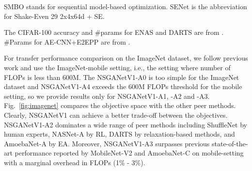 \documentclass[journal]{IEEEtran}
\def\ourmethod{NSGANetV1}
\theoremstyle{definition}
\theoremstyle{remark}
\def\sota{state-of-the-art}
\begin{document}
\begin{table*}[!htbp]
{\begin{subtable}[h]{0.92\textwidth}
{\begin{tabular}{@{ }l|cc|cc|cc|cc@{ }}
        \end{tabular}}
     \end{subtable}}
      \begin{minipage}{.9\linewidth}
      \begin{threeparttable}
        \begin{tablenotes}
        \scriptsize{
        \item[\textdagger] SMBO stands for sequential model-based optimization. SENet is the abbreviation for Shake-Even 29 2x4x64d + SE.
        \item[\textdaggerdbl] The CIFAR-100 accuracy and \#params for ENAS \cite{pmlr-v80-pham18a} and DARTS \cite{liu2018darts} are from \cite{Dong_2019_CVPR}. \#Params for AE-CNN+E2EPP are from \cite{ae-cnn}.
        }
        \end{tablenotes}
      \end{threeparttable}
    \end{minipage}
\end{table*}













For transfer performance comparison on the ImageNet dataset, we follow previous work \cite{nasnet2018,liu2018darts,pmlr-v80-pham18a,sandler2018mobilenetv2} and use the ImageNet-mobile setting, i.e., the setting where number of FLOPs is less than 600M. The \ourmethod{}-A0 is too simple for the ImageNet dataset and \ourmethod{}-A4 exceeds the 600M FLOPs threshold for the mobile setting, so we provide results only for \ourmethod{}-A1, -A2 and -A3. Fig.~\ref{fig:imagenet} compares the objective space with the other peer methods. Clearly, \ourmethod{} can achieve a better trade-off between the objectives. \ourmethod{}-A2 dominates a wide range of peer methods including ShuffleNet \cite{zhang2018shufflenet} by human experts, NASNet-A \cite{nasnet2018} by RL, DARTS \cite{liu2018darts} by relaxation-based methods, and AmoebaNet-A \cite{real2019regularized} by EA. Moreover, \ourmethod{}-A3 surpasses previous \sota{} performance reported by MobileNet-V2 \cite{sandler2018mobilenetv2} and AmoebaNet-C \cite{real2019regularized} on mobile-setting with a marginal overhead in FLOPs (1\% - 3\%).

\vspace{-2mm}
\end{document}

